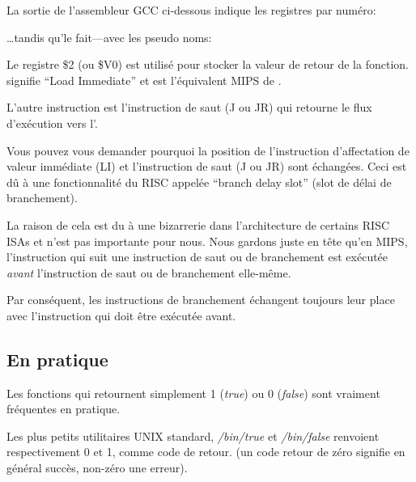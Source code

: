 La sortie de l'assembleur GCC ci-dessous indique les registres par numéro:



\dots tandis qu'\IDA le fait---avec les pseudo noms:



Le registre \$2 (ou \$V0) est utilisé pour stocker la valeur de retour de la fonction.
 signifie ``Load Immediate'' et est l'équivalent MIPS de \MOV.


L'autre instruction est l'instruction de saut (J ou JR) qui retourne le flux d'exécution vers l'.


Vous pouvez vous demander pourquoi la position de l'instruction d'affectation de
valeur immédiate (LI) et l'instruction de saut (J ou JR) sont échangées. Ceci est
dû à une fonctionnalité du \ac{RISC} appelée ``branch delay slot'' (slot de délai
de branchement).

La raison de cela est du à une bizarrerie dans l'architecture de certains RISC \ac{ISA}s et n'est pas importante pour nous. Nous gardons juste en tête qu'en MIPS, l'instruction qui suit une instruction de saut ou de branchement est exécutée \emph{avant} l'instruction de saut ou de branchement elle-même.

Par conséquent, les instructions de branchement échangent toujours leur place avec l'instruction qui doit être exécutée avant.


\subsection{En pratique}

Les fonctions qui retournent simplement 1 (\emph{true}) ou 0 (\emph{false}) sont vraiment fréquentes en pratique.

Les plus petits utilitaires UNIX standard, \emph{/bin/true} et \emph{/bin/false} renvoient
respectivement 0 et 1, comme code de retour.
(un code retour de zéro signifie en général succès, non-zéro une erreur).

